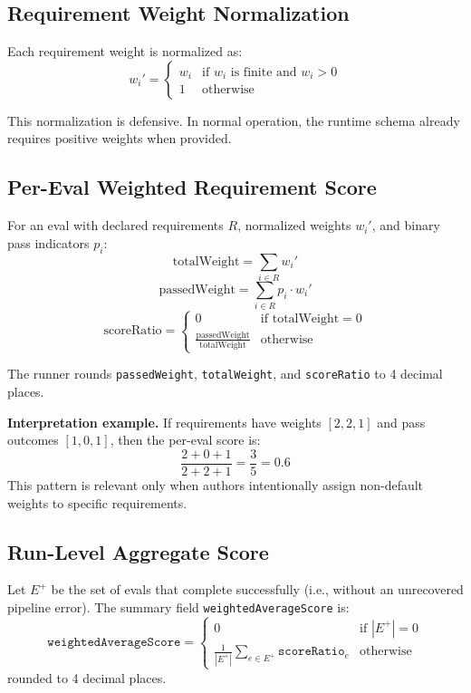 \documentclass[11pt]{article}
\begin{document}
\subsection{Requirement Weight Normalization}
Each requirement weight is normalized as:
\[
w_i' =
\begin{cases}
w_i & \text{if } w_i \text{ is finite and } w_i > 0 \\
1 & \text{otherwise}
\end{cases}
\]

This normalization is defensive. In normal operation, the runtime schema already requires positive weights when provided.

\subsection{Per-Eval Weighted Requirement Score}
For an eval with declared requirements \(R\), normalized weights \(w_i'\), and binary pass indicators \(p_i\):
\[
\text{totalWeight} = \sum_{i \in R} w_i'
\]
\[
\text{passedWeight} = \sum_{i \in R} p_i \cdot w_i'
\]
\[
\text{scoreRatio} =
\begin{cases}
0 & \text{if } \text{totalWeight} = 0 \\
\frac{\text{passedWeight}}{\text{totalWeight}} & \text{otherwise}
\end{cases}
\]

The runner rounds \texttt{passedWeight}, \texttt{totalWeight}, and \texttt{scoreRatio} to 4 decimal places.

\textbf{Interpretation example.} If requirements have weights \([2, 2, 1]\) and pass outcomes \([1, 0, 1]\), then the per-eval score is:
\[
\frac{2 + 0 + 1}{2 + 2 + 1} = \frac{3}{5} = 0.6
\]
This pattern is relevant only when authors intentionally assign non-default weights to specific requirements.

\subsection{Run-Level Aggregate Score}
Let \(E^+\) be the set of evals that complete successfully (i.e., without an unrecovered pipeline error). The summary field \texttt{weightedAverageScore} is:
\[
\texttt{weightedAverageScore} =
\begin{cases}
0 & \text{if } |E^+| = 0 \\
\frac{1}{|E^+|}\sum_{e \in E^+}\texttt{scoreRatio}_e & \text{otherwise}
\end{cases}
\]
rounded to 4 decimal places.
\end{document}
